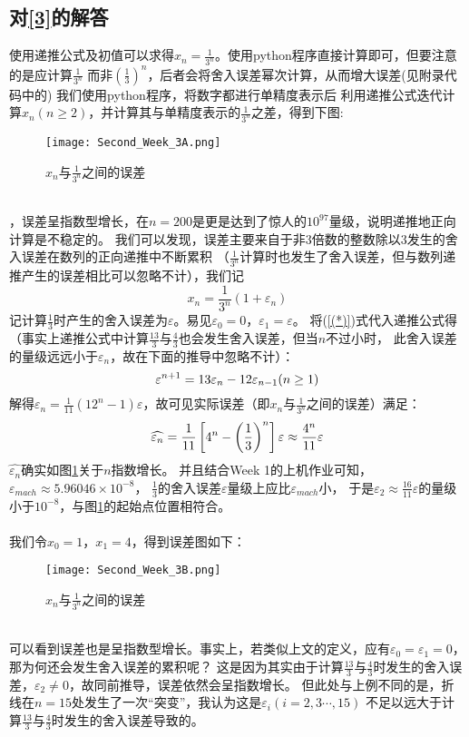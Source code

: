 \documentclass[a4paper,11pt,openany,notitlepage]{book}
\begin{document}
\subsection{对\ref{3}的解答}
使用递推公式及初值可以求得$x_{n}=\frac{1}{3^{n}}$。使用python程序直接计算即可，但要注意的是应计算$\frac{1}{3^{n}}$
而非$\left(\frac{1}{3}\right)^{n}$，后者会将舍入误差幂次计算，从而增大误差(见附录代码中的)
我们使用python程序，将数字都进行单精度表示后
利用递推公式迭代计算$x_{n}(n\geq2)$，并计算其与单精度表示的$\frac{1}{3^{n}}$之差，得到下图:
\begin{figure}[h]
    \centering
    \texttt{[image: Second\_Week\_3A.png]}
    \caption{$x_{n}$与$\frac{1}{3^{n}}$之间的误差}
    \label{pic 1}
\end{figure}
\\，误差呈指数型增长，在$n=200$是更是达到了惊人的$10^{97}$量级，说明递推地正向计算是不稳定的。
我们可以发现，误差主要来自于非$3$倍数的整数除以$3$发生的舍入误差在数列的正向递推中不断累积
（$\frac{1}{3^{n}}$计算时也发生了舍入误差，但与数列递推产生的误差相比可以忽略不计），我们记
\begin{equation}
    x_{n}=\frac{1}{3^{n}}(1+\varepsilon_{n}) \label{(*)}
\end{equation}
记计算$\frac{1}{3}$时产生的舍入误差为$\varepsilon$。易见$\varepsilon_{0}=0$，$\varepsilon_{1}=\varepsilon$。
将(\ref{(*)})式代入递推公式得（事实上递推公式中计算$\frac{13}{3}$与$\frac{4}{3}$也会发生舍入误差，但当$n$不过小时，
此舍入误差的量级远远小于$\varepsilon_{n}$，故在下面的推导中忽略不计）：
\begin{equation}
    \varepsilon^{n+1}=13\varepsilon_{n}-12\varepsilon_{n-1}(n\geq1)\notag
\end{equation}
解得$\varepsilon_{n}=\frac{1}{11}(12^{n}-1)\varepsilon$，故可见实际误差（即$x_{n}$与$\frac{1}{3^{n}}$之间的误差）满足：
\begin{equation}
    \widehat{\varepsilon_{n}}=\frac{1}{11}\left[4^{n}-\left(\frac{1}{3}\right)^{n}\right]\varepsilon\approx\frac{4^{n}}{11}\varepsilon\notag
\end{equation}
$\widehat{\varepsilon_{n}}$确实如图\ref{pic 1}关于$n$指数增长。
并且结合Week 1的上机作业可知，$\varepsilon_{mach} \approx 5.96046 \times 10^{-8}$，
$\frac{1}{3}$的舍入误差$\varepsilon$量级上应比$\varepsilon_{mach}$小，
于是$\varepsilon_{2}\approx\frac{16}{11}\varepsilon$的量级小于$10^{-8}$，与图\ref{pic 1}的起始点位置相符合。\\
\\我们令$x_{0}=1$，$x_{1}=4$，得到误差图如下：
\begin{figure}[h]
    \centering
    \texttt{[image: Second\_Week\_3B.png]}
    \caption{$x_{n}$与$\frac{1}{3^{n}}$之间的误差}
    \label{pic 2}
\end{figure}
\\可以看到误差也是呈指数型增长。事实上，若类似上文的定义，应有$\varepsilon_{0}=\varepsilon_{1}=0$，那为何还会发生舍入误差的累积呢？
这是因为其实由于计算$\frac{13}{3}$与$\frac{4}{3}$时发生的舍入误差，$\varepsilon_{2}\neq0$，故同前推导，误差依然会呈指数增长。
但此处与上例不同的是，折线在$n=15$处发生了一次“突变”，我认为这是$\varepsilon_{i}(i=2,3\cdots,15)$
不足以远大于计算$\frac{13}{3}$与$\frac{4}{3}$时发生的舍入误差导致的。
\end{document}
